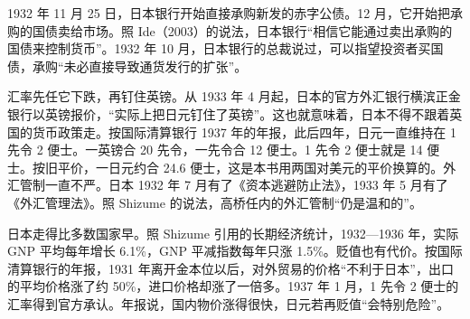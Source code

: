 1932 年 11 月 25 日，日本银行开始直接承购新发的赤字公债\cite{shizume2009,ide2003}。12 月，它开始把承购的国债卖给市场\cite{bojchron}。照 Ide（2003）的说法，日本银行“相信它能通过卖出承购的国债来控制货币”\cite{ide2003}。1932 年 10 月，日本银行的总裁说过，可以指望投资者买国债，承购“未必直接导致通货发行的扩张”\cite{ide2003}。

汇率先任它下跌，再钉住英镑。从 1933 年 4 月起，日本的官方外汇银行横滨正金银行以英镑报价，“实际上把日元钉住了英镑”\cite{shizume2009}。这也就意味着，日本不得不跟着英国的货币政策走\cite{shizume2009}。按国际清算银行 1937 年的年报，此后四年，日元一直维持在 1 先令 2 便士\cite{bis1937}。一英镑合 20 先令，一先令合 12 便士。1 先令 2 便士就是 14 便士。按旧平价，一日元约合 24.6 便士，这是本书用两国对美元的平价换算的。外汇管制一直不严。日本 1932 年 7 月有了《资本逃避防止法》，1933 年 5 月有了《外汇管理法》\cite{shizume2009,bojchron}。照 Shizume 的说法，高桥任内的外汇管制“仍是温和的”\cite{shizume2009}。

日本走得比多数国家早。照 Shizume 引用的长期经济统计，1932—1936 年，实际 GNP 平均每年增长 6.1\%，GNP 平减指数每年只涨 1.5\%\cite{shizume2009}。贬值也有代价。按国际清算银行的年报，1931 年离开金本位以后，对外贸易的价格“不利于日本”，出口的平均价格涨了约 50\%，进口价格却涨了一倍多\cite{bis1937}。1937 年 1 月，1 先令 2 便士的汇率得到官方承认\cite{bis1937}。年报说，国内物价涨得很快，日元若再贬值“会特别危险”\cite{bis1937}。


